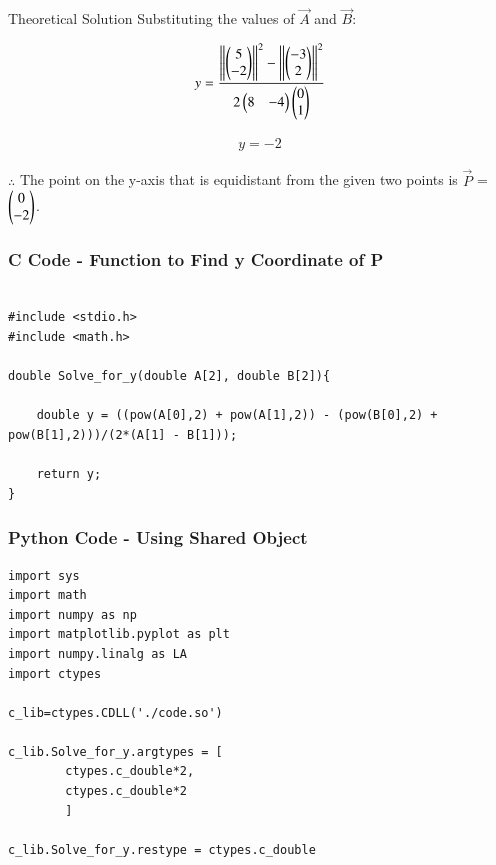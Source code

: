 \documentclass{beamer}
\begin{document}
\begin{frame}{Theoretical Solution}
Substituting the values of $\vec{A}$ and $\vec{B}$:

\begin{align}
    y = \frac{\left\lVert\begin{pmatrix}5\\-2\end{pmatrix}\right\rVert^2 - \left\lVert\begin{pmatrix}-3 \\2\end{pmatrix}\right\rVert^2}{2\begin{pmatrix}8 & -4\end{pmatrix}\begin{pmatrix}0\\1\end{pmatrix}}
\end{align}

\begin{align}
    y = -2
\end{align}

$\therefore$ The point on the y-axis that is equidistant from the given two points is $\vec{P}$ = $\begin{pmatrix}0\\-2\end{pmatrix}$.

\end{frame}

\begin{frame}[fragile]
    \frametitle{C Code - Function to Find y Coordinate of P}

    \begin{lstlisting}

#include <stdio.h>
#include <math.h>

double Solve_for_y(double A[2], double B[2]){
	
	double y = ((pow(A[0],2) + pow(A[1],2)) - (pow(B[0],2) + pow(B[1],2)))/(2*(A[1] - B[1]));

	return y;
}
    \end{lstlisting}

\end{frame}

\begin{frame}[fragile]
    \frametitle{Python Code - Using Shared Object}
    \begin{lstlisting}
import sys
import math
import numpy as np
import matplotlib.pyplot as plt
import numpy.linalg as LA
import ctypes

c_lib=ctypes.CDLL('./code.so')

c_lib.Solve_for_y.argtypes = [
        ctypes.c_double*2,
        ctypes.c_double*2
        ]

c_lib.Solve_for_y.restype = ctypes.c_double

\end{lstlisting}
\end{frame}
\end{document}
